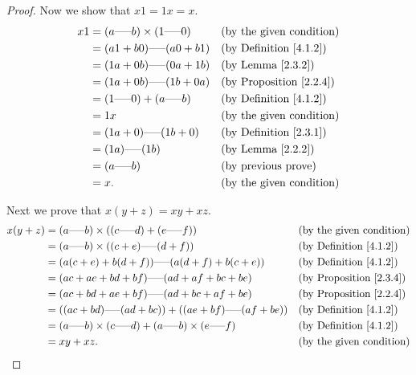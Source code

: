 \begin{proof}
Now we show that \(x1 = 1x = x\).
\begin{align*}
x1 &= (a \text{-----} b) \times (1 \text{-----} 0) && \text{(by the given condition)} \\
&= (a1 + b0) \text{-----} (a0 + b1) && \text{(by Definition \ref{4.1.2})} \\
&= (1a + 0b) \text{-----} (0a + 1b) && \text{(by Lemma \ref{2.3.2})} \\
&= (1a + 0b) \text{-----} (1b + 0a) && \text{(by Proposition \ref{2.2.4})} \\
&= (1 \text{-----} 0) + (a \text{-----} b) && \text{(by Definition \ref{4.1.2})} \\
&= 1x && \text{(by the given condition)} \\
&= (1a + 0) \text{-----} (1b + 0) && \text{(by Definition \ref{2.3.1})} \\
&= (1a) \text{-----} (1b) && \text{(by Lemma \ref{2.2.2})} \\
&= (a \text{-----} b) && \text{(by previous prove)} \\
&= x. && \text{(by the given condition)}
\end{align*}

Next we prove that \(x(y + z) = xy + xz\).
\begin{align*}
x(y + z) &= (a \text{-----} b) \times ((c \text{-----} d) + (e \text{-----} f)) && \text{(by the given condition)} \\
&= (a \text{-----} b) \times ((c + e) \text{-----} (d + f)) && \text{(by Definition \ref{4.1.2})} \\
&= (a(c + e) + b(d + f)) \text{-----} (a(d + f) + b(c + e)) && \text{(by Definition \ref{4.1.2})} \\
&= (ac + ae + bd + bf) \text{-----} (ad + af + bc + be) && \text{(by Proposition \ref{2.3.4})} \\
&= (ac + bd + ae + bf) \text{-----} (ad + bc + af + be) && \text{(by Proposition \ref{2.2.4})} \\
&= ((ac + bd) \text{-----} (ad + bc)) + ((ae + bf) \text{-----} (af + be)) && \text{(by Definition \ref{4.1.2})} \\
&= (a \text{-----} b) \times (c \text{-----} d) + (a \text{-----} b) \times (e \text{-----} f) && \text{(by Definition \ref{4.1.2})} \\
&= xy + xz. && \text{(by the given condition)}
\end{align*}


\end{proof}
